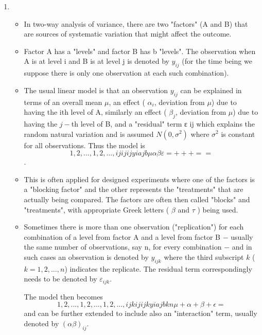 \documentclass[a4paper,12pt]{article}
\begin{document}
\begin{enumerate} 
\item  

\begin{itemize}
\item In two-way analysis of variance, there are two "factors" (A and B) that are sources of systematic variation that might affect the outcome.  
\item Factor A has a "levels" and factor B has b "levels".  The observation when A is at level i and B is at level j is denoted by $y_{ij}$ (for the time being we suppose there is only one observation at each such combination).  
\item The usual linear model is that an observation $y_{ij}$ can be explained in terms of an overall mean $\mu$, an effect ( $\alpha_i$, deviation from $\mu$) due to having the ith level of A, similarly an effect ( $\beta_j$, deviation from $\mu$) due to having the $j-$th level of B, and a "residual" term ε ij which explains the random natural variation and is assumed $N(0, \sigma^2)$ where $\sigma^2$ is constant for all observations.  Thus the model is 
\[  1,2,..., 1,2,..., ij i j ij y i a j b \mu \alpha\beta ε = + + + = = \]. 
 \item This is often applied for designed experiments where one of the factors is a "blocking factor" and the other represents the "treatments" that are actually being compared.  The factors are often then called "blocks" and "treatments", with appropriate Greek letters ( $\beta$ and $\tau$ ) being used. 
 
\item Sometimes there is more than one observation ("replication") for each combination of a level from factor A and a level from factor B  −  usually the same number of observations, say n, for every combination  −  and in such cases an observation is denoted by $y_{ijk}$ where the third subscript $k$ ($k = 1, 2, \ldots, n$) indicates the replicate.  The residual term correspondingly needs to be denoted by $\varepsilon_{ijk}$.  

The model then becomes 
\[  1,2,..., 1,2,..., 1,2,..., ijk i j ijk y i a j b k n \mu + \alpha + \beta + \epsilon = \] and can be further extended to include also an "interaction" term, usually denoted by $( \alpha \beta )_{ij}$.  
  

\end{itemize}
\end{enumerate}
\end{document}
